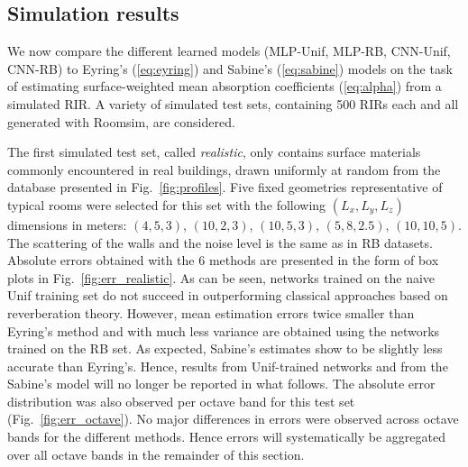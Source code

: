 \documentclass[reprint]{JASA}
\makeatletter
\newif\ifnotes
\newcommand{\note}[1]{\@bsphack\ifnotes{#1}\fi\@esphack}
\makeatother
\begin{document}
\subsection{Simulation results} %
We now compare the different learned models (MLP-Unif, MLP-RB, CNN-Unif, CNN-RB) to Eyring's (\ref{eq:eyring}) and Sabine's (\ref{eq:sabine}) models on the task of estimating surface-weighted mean absorption coefficients (\ref{eq:alpha}) from a simulated RIR. A variety of simulated test sets, containing 500 RIRs each and all generated with Roomsim, are considered.

\note{\sout{and the metric used is the mean absolute difference between estimated mean absorption coefficients and true ones, defined by (\ref{eq:alpha}). Eyring's and Sabine's formulas are always given the true volume $V$ and total surface $S$ for each room. Moreover, a preliminary study was made on a noiseless version of the RB training set to identify the best $\mathrm{RT}(b)$ computation method for these techniques, namely, what log-energy decay $\Delta E$ should be considered to compute the slope of Schroeder's curves, starting -5~dB from the initial level. We tested the values $\Delta E = -10, -15, -20, -30$ and $-60$~dB, and selected $\Delta E=-30$~dB, which yielded the smallest mean estimation errors.}}

The first simulated test set, called \textit{realistic}, only contains surface materials commonly encountered in real buildings, drawn uniformly at random from the database presented in Fig.~\ref{fig:profiles}. Five fixed geometries representative of typical rooms were selected for this set with the following $(L_x, L_y, L_z)$ dimensions in meters: $(4, 5, 3)$, $(10, 2, 3)$, $(10, 5, 3)$, $(5, 8, 2.5)$, $(10, 10, 5)$. The scattering of the walls and the noise level is the same as in RB datasets. Absolute errors obtained with the 6 methods are presented in the form of box plots in Fig.~\ref{fig:err_realistic}. As can be seen, networks trained on the naive Unif training set do not succeed in outperforming classical approaches based on reverberation theory. However, mean estimation errors twice smaller than Eyring's method and with much less variance are obtained using the networks trained on the RB set. As expected, Sabine's estimates show to be slightly less accurate than Eyring's. Hence, results from Unif-trained networks and from the Sabine's model will no longer be reported in what follows. The absolute error distribution was also observed per octave band for this test set (Fig.~\ref{fig:err_octave}). No major differences in errors were observed across octave bands for the different methods. Hence errors will systematically be aggregated over all octave bands in the remainder of this section.
\end{document}
